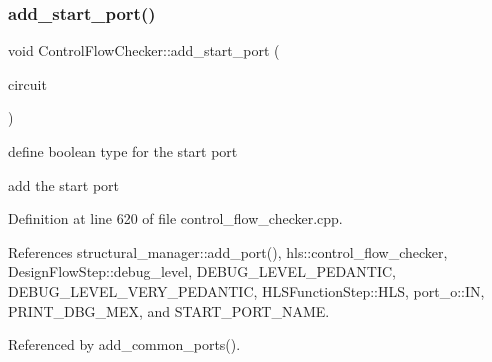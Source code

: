 \subsubsection{\texorpdfstring{add\+\_\+start\+\_\+port()}{add\_start\_port()}}
{\footnotesize\ttfamily void Control\+Flow\+Checker\+::add\+\_\+start\+\_\+port (\begin{DoxyParamCaption}\item[{\hyperlink{structural__objects_8hpp_a8ea5f8cc50ab8f4c31e2751074ff60b2}{structural\+\_\+object\+Ref}}]{circuit }\end{DoxyParamCaption})\hspace{0.3cm}{\ttfamily [protected]}}

define boolean type for the start port

add the start port 

Definition at line 620 of file control\+\_\+flow\+\_\+checker.\+cpp.



References structural\+\_\+manager\+::add\+\_\+port(), hls\+::control\+\_\+flow\+\_\+checker, Design\+Flow\+Step\+::debug\+\_\+level, D\+E\+B\+U\+G\+\_\+\+L\+E\+V\+E\+L\+\_\+\+P\+E\+D\+A\+N\+T\+IC, D\+E\+B\+U\+G\+\_\+\+L\+E\+V\+E\+L\+\_\+\+V\+E\+R\+Y\+\_\+\+P\+E\+D\+A\+N\+T\+IC, H\+L\+S\+Function\+Step\+::\+H\+LS, port\+\_\+o\+::\+IN, P\+R\+I\+N\+T\+\_\+\+D\+B\+G\+\_\+\+M\+EX, and S\+T\+A\+R\+T\+\_\+\+P\+O\+R\+T\+\_\+\+N\+A\+ME.



Referenced by add\+\_\+common\+\_\+ports().

